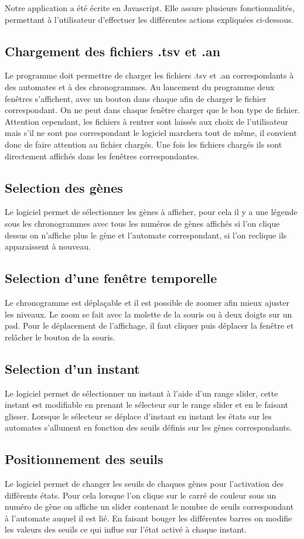 
Notre application a été écrite en Javascript. Elle assure plusieurs fonctionnalités, permettant à l'utilisateur d'effectuer les différentes actions expliquées ci-dessous.
\bigbreak
\subsection{Chargement des fichiers .tsv et .an}

\bigbreak
Le programme doit permettre de charger les fichiers .tsv et .an correspondants à des automates et à des chronogrammes. Au lancement du programme deux fenêtres s’affichent, avec un bouton dans chaque  afin de charger le fichier correspondant. On ne peut dans chaque fenêtre charger que le bon type de fichier. Attention cependant, les fichiers à rentrer sont laissés aux choix de l’utilisateur mais s’il ne sont pas correspondant le logiciel marchera tout de même, il convient donc de faire attention au fichier chargés.
Une fois les fichiers chargés ils sont directement affichés dans les fenêtres correspondantes.
\bigbreak

\subsection{Selection des gènes}
\bigbreak
Le logiciel permet de sélectionner les gènes à afficher, pour cela il y a une légende sous les chronogrammes avec tous les numéros de gènes affichés si l’on clique dessus on n’affiche plus le gène et l’automate correspondant, si l’on reclique ils apparaissent à nouveau.
\bigbreak

\subsection{Selection d'une fenêtre temporelle}
\bigbreak
Le chronogramme est déplaçable et il est possible de zoomer afin mieux ajuster les niveaux. Le zoom se fait avec la molette de la souris ou à deux doigts sur un pad. Pour le déplacement de l’affichage, il faut cliquer puis déplacer la fenêtre et relâcher le bouton de la souris.
\bigbreak

\subsection{Selection d'un instant}
\bigbreak
Le logiciel permet de sélectionner un instant à l’aide d’un range slider,  cette instant est modifiable en prenant le sélecteur sur le range slider et en le faisant glisser. Lorsque le sélecteur se déplace d’instant en instant les états sur les automates s’allument en fonction des seuils définis sur les gènes correspondants.
\bigbreak

\subsection{Positionnement des seuils}
\bigbreak
Le logiciel permet de changer les seuils de chaques gènes pour l’activation des différents états. Pour cela lorsque l’on clique sur le carré de couleur sous un numéro de gène on affiche un slider contenant le nombre de seuils correspondant à l’automate auquel il est lié. En faisant bouger les différentes barres on modifie les valeurs des seuils ce qui influe sur l’état activé à chaque instant.